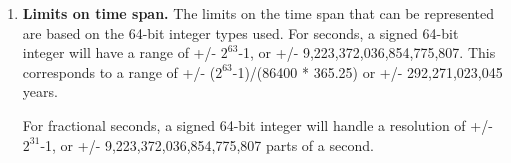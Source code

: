 
\begin{enumerate}

\item {\bf Limits on time span.} The limits on the time span that can be
represented are based on the 64-bit integer types used.  For
seconds, a signed 64-bit integer will have a range of +/- $2^{63}$-1, or
+/- 9,223,372,036,854,775,807.  This corresponds to a range of
+/- ($2^{63}$-1)/(86400 * 365.25) or +/- 292,271,023,045 years.

\begin{sloppypar}
For fractional seconds, a signed 64-bit integer will handle a resolution of
+/- $2^{31}$-1, or +/- 9,223,372,036,854,775,807 parts of a second.
\end{sloppypar}

\end{enumerate}
